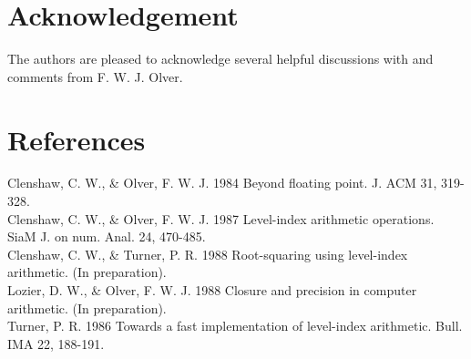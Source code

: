 \documentclass[10pt]{article}
\begin{document}
\section*{Acknowledgement}
The authors are pleased to acknowledge several helpful discussions with and comments from F. W. J. Olver.

\section*{References}
Clenshaw, C. W., \& Olver, F. W. J. 1984 Beyond floating point. J. ACM 31, 319-328.\\
Clenshaw, C. W., \& Olver, F. W. J. 1987 Level-index arithmetic operations. SiaM J. on num. Anal. 24, 470-485.\\
Clenshaw, C. W., \& Turner, P. R. 1988 Root-squaring using level-index arithmetic. (In preparation).\\
Lozier, D. W., \& Olver, F. W. J. 1988 Closure and precision in computer arithmetic. (In preparation).\\
Turner, P. R. 1986 Towards a fast implementation of level-index arithmetic. Bull. IMA 22, 188-191.
\end{document}
